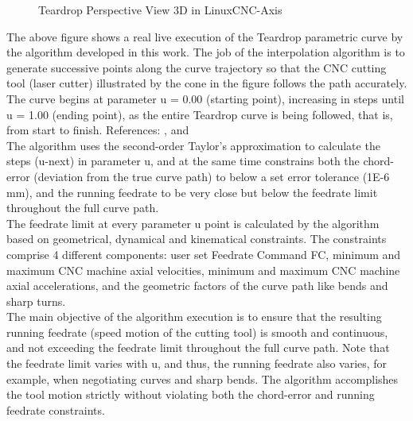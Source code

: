\begin{figure}
	\caption  {Teardrop Perspective View 3D in LinuxCNC-Axis}
	\label{img-Chap4-Teardrop-Perspective-View-3D-from-LinuxCNC-Axis.pdf}
	\centering
\end{figure}	

The above figure shows a real live execution of the Teardrop parametric curve by the algorithm developed in this work. The job of the interpolation algorithm is to generate successive points along the curve trajectory so that the CNC cutting tool (laser cutter) illustrated by the cone in the figure follows the path accurately. The curve begins at parameter u = 0.00 (starting point), increasing in steps until u = 1.00 (ending point), as the entire Teardrop curve is being followed, that is, from start to finish. References: \cite{Zhong-etal:2018}, and \cite{Shengzhou-etal:2020} \\

The algorithm uses the second-order Taylor's approximation to calculate the steps (u-next) in parameter u, and at the same time constrains both the chord-error (deviation from the true curve path) to below a set error tolerance (1E-6 mm), and the running feedrate to be very close but below the feedrate limit throughout the full curve path. \\

The feedrate limit at every parameter u point is calculated by the algorithm based on geometrical, dynamical and kinematical constraints. The constraints comprise 4 different components: user set Feedrate Command FC, minimum and maximum CNC machine axial velocities, minimum and maximum CNC machine axial accelerations, and the geometric factors of the curve path like bends and sharp turns. \\

The main objective of the algorithm execution is to ensure that the resulting running feedrate (speed motion of the cutting tool) is smooth and continuous, and not exceeding the feedrate limit throughout the full curve path. Note that the feedrate limit varies with u, and thus, the running feedrate also varies, for example, when negotiating curves and sharp bends. The algorithm accomplishes the tool motion strictly without violating both the chord-error and running feedrate constraints. \\

